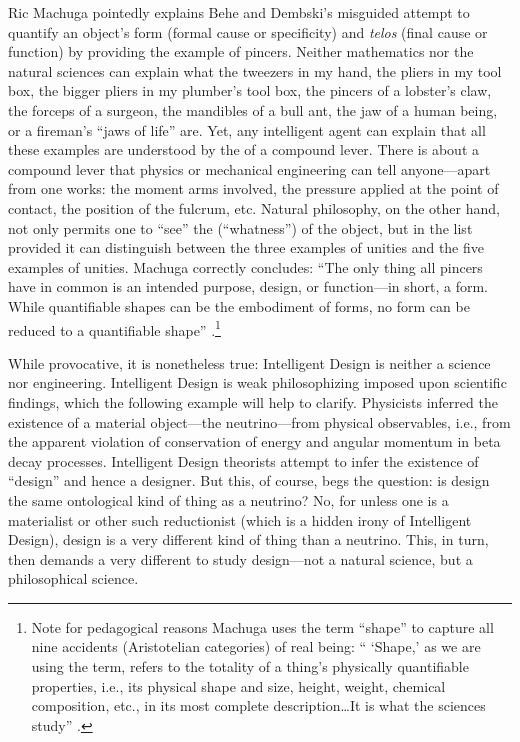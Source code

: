Ric Machuga pointedly explains Behe and Dembski's misguided attempt to quantify an object's form (formal cause or specificity) and \textit{telos} (final cause or function) by providing the example of pincers. Neither mathematics nor the natural sciences can explain what the tweezers in my hand, the pliers in my tool box, the bigger pliers in my plumber's tool box, the pincers of a lobster's claw, the forceps of a surgeon, the mandibles of a bull ant, the jaw of a human being, or a fireman's ``jaws of life'' are. Yet, any intelligent agent can explain that all these examples are understood by the  of a compound lever. There is  about  a compound lever  that physics or mechanical engineering can tell anyone---apart from  one works: the moment arms involved, the pressure applied at the point of contact, the position of the fulcrum, etc. Natural philosophy, on the other hand, not only permits one to ``see'' the  (``whatness'') of the object, but in the list provided it can distinguish between the three examples of  unities and the five examples of  unities. Machuga correctly concludes: ``The only thing all pincers have in common is an intended purpose, design, or function---in short, a form. While quantifiable shapes can be the embodiment of forms, no form can be reduced to a quantifiable shape'' \cite[p.~162]{machuga}.\footnote{Note for pedagogical reasons Machuga uses the term ``shape'' to capture all nine accidents (Aristotelian categories) of real being: `` `Shape,' as we are using the term, refers to the totality of a thing's physically quantifiable properties, i.e., its physical shape and size, height, weight, chemical composition, etc., in its most complete description\ldots It is what the sciences study'' \citep[][p.~27]{machuga}.}

While provocative, it is nonetheless true: Intelligent Design is neither a science nor engineering. Intelligent Design is weak philosophizing imposed upon scientific findings, which the following example will help to clarify. Physicists inferred the existence of a material object---the neutrino---from physical observables, i.e., from the apparent violation of conservation of energy and angular momentum in beta decay processes. Intelligent Design theorists attempt to infer the existence of ``design'' and hence a designer. But this, of course, begs the question: is design the same ontological kind of thing as a neutrino? No, for unless one is a materialist or other such reductionist (which is a hidden irony of Intelligent Design), design is a very different kind of thing than a neutrino.  This, in turn, then demands a very different  to study design---not a natural science, but a philosophical science.

